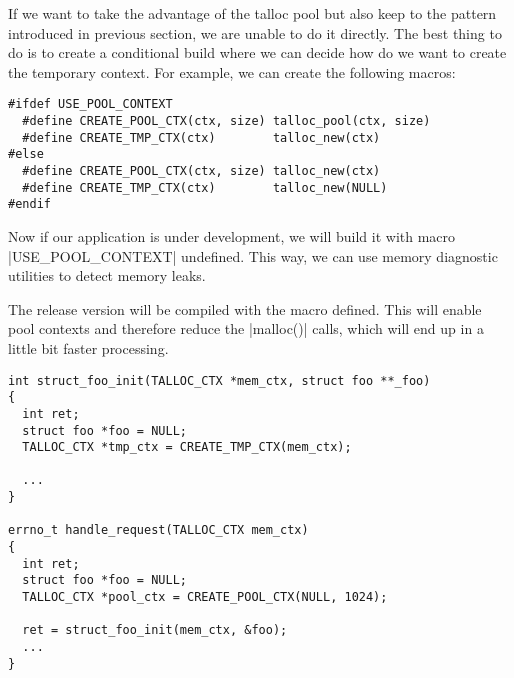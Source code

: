 If we want to take the advantage of the talloc pool but also keep to the
pattern introduced in previous section, we are unable to do it directly. The
best thing to do is to create a conditional build where we can decide how do we
want to create the temporary context. For example, we can create the following
macros:

\begin{lstlisting}[caption={Conditional temporary context
macros},label=lst:tmp-ctx-4]
#ifdef USE_POOL_CONTEXT
  #define CREATE_POOL_CTX(ctx, size) talloc_pool(ctx, size)
  #define CREATE_TMP_CTX(ctx)        talloc_new(ctx)
#else
  #define CREATE_POOL_CTX(ctx, size) talloc_new(ctx)
  #define CREATE_TMP_CTX(ctx)        talloc_new(NULL)
#endif
\end{lstlisting}

Now if our application is under development, we will build it with macro
|USE_POOL_CONTEXT| undefined. This way, we  can use memory diagnostic
utilities to detect memory leaks.

The release version will be compiled with the macro defined. This will  enable
pool contexts and therefore reduce the |malloc()| calls, which will end up in a
little bit faster processing.

\begin{lstlisting}[caption={Conditional temporary context},label=lst:tmp-ctx-5]
int struct_foo_init(TALLOC_CTX *mem_ctx, struct foo **_foo)
{
  int ret;
  struct foo *foo = NULL;
  TALLOC_CTX *tmp_ctx = CREATE_TMP_CTX(mem_ctx);

  ...
}

errno_t handle_request(TALLOC_CTX mem_ctx)
{
  int ret;
  struct foo *foo = NULL;
  TALLOC_CTX *pool_ctx = CREATE_POOL_CTX(NULL, 1024);
  
  ret = struct_foo_init(mem_ctx, &foo);
  ...
}
\end{lstlisting}
